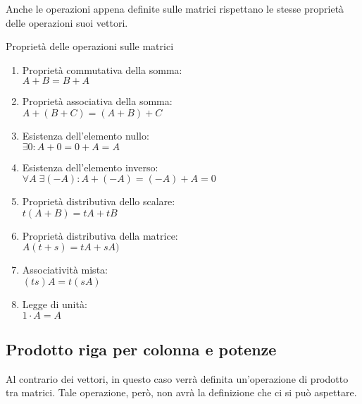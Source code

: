 Anche le operazioni appena definite sulle matrici rispettano le stesse proprietà delle operazioni suoi vettori.
\begin{teo}{Proprietà delle operazioni sulle matrici}
    \begin{enumerate}
        \item Proprietà commutativa della somma: \\
              $A + B = B + A$

        \item Proprietà associativa della somma: \\
              $A + (B + C) = (A + B) + C$

        \item Esistenza dell'elemento nullo: \\
              $\exists 0 : A + 0 = 0 + A = A$

        \item Esistenza dell'elemento inverso: \\
              $\forall A\;\exists (-A) : A + (-A) = (-A) + A = 0$

        \item Proprietà distributiva dello scalare: \\
              $t(A + B) = tA + tB$

        \item Proprietà distributiva della matrice: \\
              $A(t + s) = tA + sA)$

        \item Associatività mista: \\
              $(ts)A = t(sA)$

        \item Legge di unità: \\
              $1 \cdot A = A$
    \end{enumerate}
\end{teo}

\subsection{Prodotto riga per colonna e potenze}
Al contrario dei vettori, in questo caso verrà definita un'operazione di prodotto tra matrici. Tale operazione, però, non avrà la definizione che ci si può aspettare.

